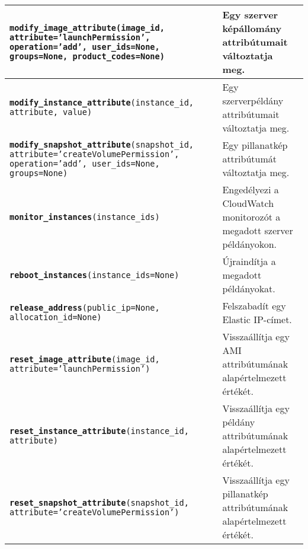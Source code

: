 \begin{table}[h]
\begin{tabular}{| p{8.0cm} | p{6.0cm} |}
        \hline
        \texttt{\textbf{modify\_image\_attribute}(image\_id, attribute='launchPermission', operation='add', user\_ids=None, groups=None, product\_codes=None)} & Egy szerver képállomány attribútumait változtatja meg. \\
        \hline
        \texttt{\textbf{modify\_instance\_attribute}(instance\_id, attribute, value)} & Egy szerverpéldány attribútumait változtatja meg. \\
        \hline
        \texttt{\textbf{modify\_snapshot\_attribute}(snapshot\_id, attribute='createVolumePermission', operation='add', user\_ids=None, groups=None)} & Egy pillanatkép attribútumát változtatja meg. \\
        \hline
        \texttt{\textbf{monitor\_instances}(instance\_ids)} & Engedélyezi a CloudWatch monitorozót a megadott szerver példányokon. \\
        \hline
        \texttt{\textbf{reboot\_instances}(instance\_ids=None)} & Újraindítja a megadott példányokat. \\
        \hline
        \texttt{\textbf{release\_address}(public\_ip=None, allocation\_id=None)} & Felszabadít egy Elastic IP-címet. \\
        \hline
        \texttt{\textbf{reset\_image\_attribute}(image\_id, attribute='launchPermission')} & Visszaállítja egy AMI attribútumának alapértelmezett értékét. \\
        \hline
        \texttt{\textbf{reset\_instance\_attribute}(instance\_id, attribute)} & Visszaállítja egy példány attribútumának alapértelmezett értékét. \\
        \hline
        \texttt{\textbf{reset\_snapshot\_attribute}(snapshot\_id, attribute='createVolumePermission')} & Visszaállítja egy pillanatkép attribútumának alapértelmezett értékét. \\
        \hline
    \end{tabular}
	\normalsize
	\label{tab:aws_boto_ec2_02}
\end{table}        
        
